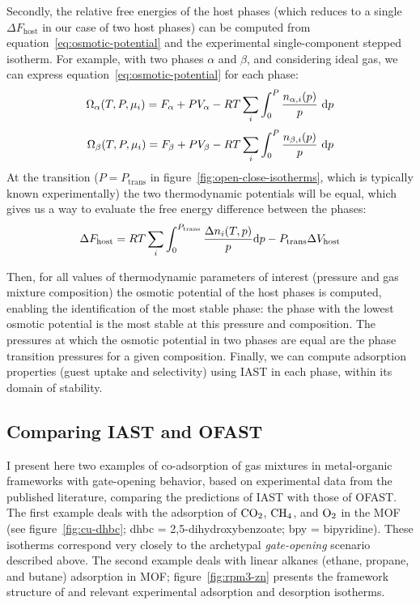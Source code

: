 \documentclass[thesis]{subfiles}
\begin{document}
Secondly, the relative free energies of the host phases (which reduces to a
single $\Delta F_\text{host}$ in our case of two host phases) can be computed
from equation~\eqref{eq:osmotic-potential} and the experimental single-component
stepped isotherm. For example, with two phases $\alpha$ and $\beta$, and
considering ideal gas, we can express equation~\eqref{eq:osmotic-potential} for
each phase:
\[\Omega_\alpha(T, P, \mu_i) = F_\alpha + P V_\alpha - RT \sum_i \int_0^P \frac{n_{\alpha, i}(p)}{p} \ \d p\]
\[\Omega_\beta(T, P, \mu_i) = F_\beta + P V_\beta - RT \sum_i \int_0^P \frac{n_{\beta, i}(p)}{p} \ \text{d} p\]
At the transition ($P=P_\text{trans}$ in figure~\ref{fig:open-close-isotherms},
which is typically known experimentally) the two thermodynamic potentials will
be equal, which gives us a way to evaluate the free energy difference between
the phases:
\[ \label{eq:ofast:delta-f}\Delta F_\text{host} = RT \sum_i \int_0^{P_\text{trans}} \frac{\Delta n_i(T, p)}{p} \text{d} p - P_\text{trans} \Delta V_\text{host}\]

Then, for all values of thermodynamic parameters of interest (pressure and gas
mixture composition) the osmotic potential of the host phases is computed,
enabling the identification of the most stable phase: the phase with the lowest
osmotic potential is the most stable at this pressure and composition. The
pressures at which the osmotic potential in two phases are equal are the phase
transition pressures for a given composition. Finally, we can compute adsorption
properties (guest uptake and selectivity) using IAST in each phase, within its
domain of stability.

\newpage
\subsection{Comparing IAST and OFAST}

I present here two examples of co-adsorption of gas mixtures in metal-organic
frameworks with gate-opening behavior, based on experimental data from the
published literature, comparing the predictions of IAST with those of OFAST. The
first example deals with the adsorption of $\ce{CO2}$, $\ce{CH4}$, and $\ce{O2}$
in the \Cudhbc MOF\cite{Kitaura2003} (see figure~\ref{fig:cu-dhbc}; dhbc =
2,5-dihydroxybenzoate; bpy = bipyridine). These isotherms correspond very
closely to the archetypal \emph{gate-opening} scenario described above. The
second example deals with linear alkanes (ethane, propane, and butane)
adsorption in \RPMZn MOF\cite{Nijem2012}; figure~\ref{fig:rpm3-zn} presents the
framework structure of \RPMZn and relevant experimental adsorption and
desorption isotherms.
\end{document}
